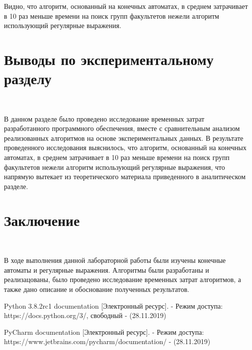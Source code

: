 \documentclass[a4paper,12pt]{article}
\begin{document}
Видно, что алгоритм, основанный на конечных автоматах, в среднем затрачивает в 10 раз меньше времени на поиск групп факультетов нежели алгоритм использующий регулярные выражения.



\section{Выводы по экспериментальному разделу}

~\

В данном разделе было проведено исследование временных затрат разработанного программного обеспечения, вместе с сравнительным анализом реализованных алгоритмов на основе экспериментальных данных. В результате проведенного исследования выяснилось, что алгоритм, основанный на конечных автоматах, в среднем затрачивает в 10 раз меньше времени на поиск групп факультетов нежели алгоритм использующий регулярные выражения, что напрямую вытекает из теоретического материала приведенного в аналитическом разделе.

\section*{Заключение}

~\

В ходе выполнения данной лабораторной работы были изучены конечные автоматы и регулярные выражения. Алгоритмы были разработаны и реализацованы, было проведено исследование временных затрат алгоритмов, а
также дано описание и обоснование полученных результатов.

\newpage

\begin{thebibliography}{}

	Python 3.8.2rc1 documentation [Электронный ресурс]. - Режим доступа: https://docs.python.org/3/, свободный - (28.11.2019)
	
	PyCharm documentation [Электронный ресурс]. - Режим доступа: https://www.jetbrains.com/pycharm/documentation/ - (28.11.2019)

\end{thebibliography}
\end{document}
